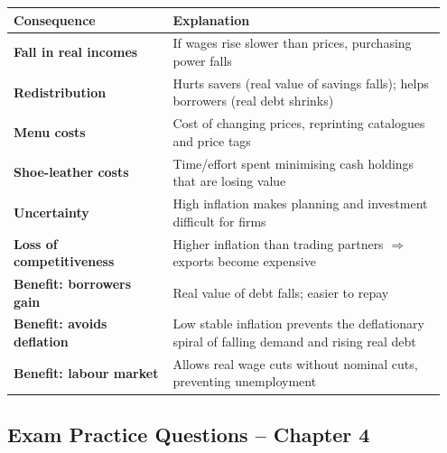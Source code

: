 \documentclass[11pt, a4paper, twoside]{book}
\begin{document}
\begin{tcolorbox}[enhanced,colback=LightBlue,colframe=MidBlue!70,arc=0pt,boxrule=0.8pt]
\begin{tabular}{@{}>{\RaggedRight\arraybackslash}p{0.35\linewidth}>{\RaggedRight\arraybackslash}p{0.60\linewidth}@{}}
\textbf{\color{NavyPrimary}Consequence} & \textbf{\color{NavyPrimary}Explanation} \\
\midrule
\textbf{Fall in real incomes} & If wages rise slower than prices, purchasing power falls \\
\textbf{Redistribution} & Hurts savers (real value of savings falls); helps borrowers (real debt shrinks) \\
\textbf{Menu costs} & Cost of changing prices, reprinting catalogues and price tags \\
\textbf{Shoe-leather costs} & Time/effort spent minimising cash holdings that are losing value \\
\textbf{Uncertainty} & High inflation makes planning and investment difficult for firms \\
\textbf{Loss of competitiveness} & Higher inflation than trading partners $\Rightarrow$ exports become expensive \\
\midrule
\textbf{Benefit: borrowers gain} & Real value of debt falls; easier to repay \\
\textbf{Benefit: avoids deflation} & Low stable inflation prevents the deflationary spiral of falling demand and rising real debt \\
\textbf{Benefit: labour market} & Allows real wage cuts without nominal cuts, preventing unemployment \\
\end{tabular}
\end{tcolorbox}

\subsection{Exam Practice Questions -- Chapter 4}
\end{document}
